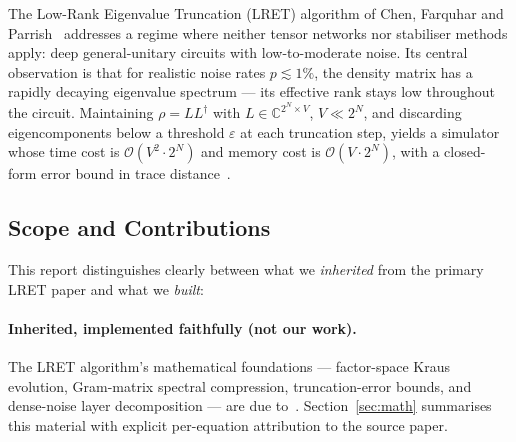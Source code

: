 \documentclass[11pt,a4paper]{article}
\begin{document}
The Low-Rank Eigenvalue Truncation (LRET) algorithm of Chen, Farquhar and
Parrish~\cite{chen2021lret} addresses a regime where neither tensor networks nor
stabiliser methods apply: deep general-unitary circuits with low-to-moderate noise.
Its central observation is that for realistic noise rates $p \lesssim 1\%$, the
density matrix has a rapidly decaying eigenvalue spectrum --- its effective rank stays
low throughout the circuit. Maintaining $\rho = LL^\dagger$ with
$L \in \mathbb{C}^{2^N \times V}$, $V\!\ll\!2^N$, and discarding eigencomponents below a
threshold $\varepsilon$ at each truncation step, yields a simulator whose time cost is
$\mathcal{O}(V^2 \cdot 2^N)$ and memory cost is $\mathcal{O}(V \cdot 2^N)$, with a
closed-form error bound in trace distance~\cite{chen2021lret}.

\subsection{Scope and Contributions}
\label{sec:contributions}

This report distinguishes clearly between what we \emph{inherited} from the primary
LRET paper and what we \emph{built}:

\paragraph{Inherited, implemented faithfully (not our work).}
The LRET algorithm's mathematical foundations --- factor-space Kraus evolution,
Gram-matrix spectral compression, truncation-error bounds, and dense-noise layer
decomposition --- are due to~\cite{chen2021lret}. Section~\ref{sec:math} summarises this
material with explicit per-equation attribution to the source paper.
\end{document}
